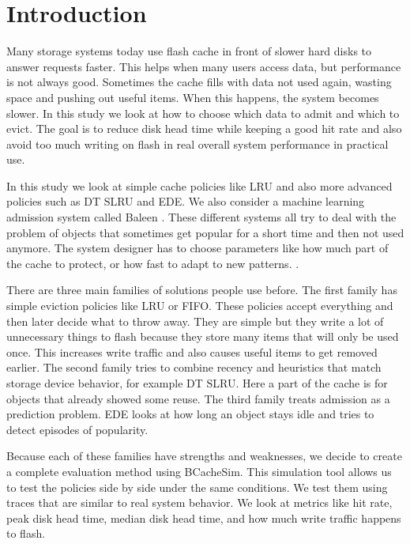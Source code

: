 \documentclass[sigconf]{acmart}
\begin{document}
\maketitle

\clearpage
\section{Introduction}
Many storage systems today use flash cache in front of slower hard disks to answer requests faster. This helps when many users access data, but performance is not always good. Sometimes the cache fills with data not used again, wasting space and pushing out useful items. When this happens, the system becomes slower. In this study we look at how to choose which data to admit and which to evict. The goal is to reduce disk head time while keeping a good hit rate and also avoid too much writing on flash in real overall system performance in practical use.

In this study we look at simple cache policies like LRU and also more advanced policies such as DT SLRU and EDE. We also consider a machine learning admission system called Baleen \cite{wong2024baleen}. These different systems all try to deal with the problem of objects that sometimes get popular for a short time and then not used anymore. The system designer has to choose parameters like how much part of the cache to protect, or how fast to adapt to new patterns. \cite{Yang2022CacheSack}.

There are three main families of solutions people use before. The first family has simple eviction policies like LRU or FIFO. These policies accept everything and then later decide what to throw away. They are simple but they write a lot of unnecessary things to flash because they store many items that will only be used once. This increases write traffic and also causes useful items to get removed earlier. The second family tries to combine recency and heuristics that match storage device behavior, for example DT SLRU. Here a part of the cache is for objects that already showed some reuse. The third family treats admission as a prediction problem. EDE looks at how long an object stays idle and tries to detect episodes of popularity.  

Because each of these families have strengths and weaknesses, we decide to create a complete evaluation method using BCacheSim. This simulation tool allows us to test the policies side by side under the same conditions. We test them using traces that are similar to real system behavior. We look at metrics like hit rate, peak disk head time, median disk head time, and how much write traffic happens to flash. 
\end{document}
